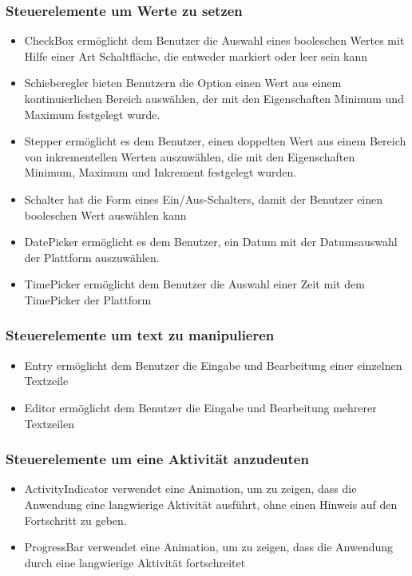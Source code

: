 \subsubsection{Steuerelemente um Werte zu setzen}


\begin{itemize}
\setlength\itemsep{-0.6em}
 \item CheckBox ermöglicht dem Benutzer die Auswahl eines booleschen Wertes mit Hilfe einer Art Schaltfläche, die entweder markiert oder leer sein kann
 \item Schieberegler bieten Benutzern die Option einen  Wert aus einem kontinuierlichen Bereich auswählen, der mit den Eigenschaften Minimum und Maximum festgelegt wurde.
 \item Stepper ermöglicht es dem Benutzer, einen doppelten Wert aus einem Bereich von inkrementellen Werten auszuwählen, die mit den Eigenschaften Minimum, Maximum und Inkrement festgelegt wurden.
 \item Schalter hat die Form eines Ein/Aus-Schalters, damit der Benutzer einen booleschen Wert auswählen kann
 \item DatePicker ermöglicht es dem Benutzer, ein Datum mit der Datumsauswahl der Plattform auszuwählen.
 \item TimePicker ermöglicht dem Benutzer die Auswahl einer Zeit mit dem TimePicker der Plattform
\end{itemize}
\subsubsection{Steuerelemente um text zu manipulieren}

\begin{itemize}
\setlength\itemsep{-0.6em}
 \item Entry ermöglicht dem Benutzer die Eingabe und Bearbeitung einer einzelnen Textzeile
 \item Editor ermöglicht dem Benutzer die Eingabe und Bearbeitung mehrerer Textzeilen
\end{itemize}
\subsubsection{Steuerelemente um eine Aktivität anzudeuten}


\begin{itemize}
\setlength\itemsep{-0.6em}
 \item ActivityIndicator verwendet eine Animation, um zu zeigen, dass die Anwendung eine langwierige Aktivität ausführt, ohne einen Hinweis auf den Fortschritt zu geben. 
 \item ProgressBar verwendet eine Animation, um zu zeigen, dass die Anwendung durch eine langwierige Aktivität fortschreitet
\end{itemize}

